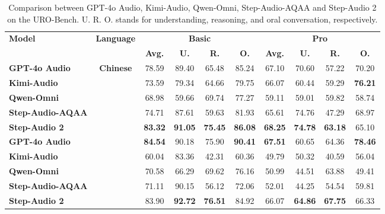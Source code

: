 \begin{table}[ht]
\centering
\caption{Comparison between GPT-4o Audio, Kimi-Audio, Qwen-Omni, Step-Audio-AQAA and Step-Audio 2 on the URO-Bench. U. R. O. stands for understanding, reasoning, and oral conversation, respectively.}
\begin{tabular}{lccccccccc}
\toprule
\multirow{2}{*}{\textbf{Model}} & \multirow{2}{*}{\textbf{Language}} & \multicolumn{4}{c}{\textbf{Basic}}& \multicolumn{4}{c}{\textbf{Pro}}\\
\cmidrule(lr){3-6} \cmidrule(lr){7-10}
&&\textbf{Avg.} & \textbf{U.} & \textbf{R.} & \textbf{O.} & \textbf{Avg.} & \textbf{U.} & \textbf{R.} & \textbf{O.} \\
\midrule
\textbf{GPT-4o Audio}&  \multirow{6}{*}{\textbf{Chinese}}&78.59&89.40 &65.48 &85.24 &67.10&70.60 &57.22 & 70.20 \\
\textbf{Kimi-Audio} &                                    &73.59&79.34 &64.66 &79.75 &66.07&60.44 &59.29 & \textbf{76.21} \\
\textbf{Qwen-Omni} &                                     &68.98&59.66 &69.74 &77.27 &59.11&59.01 &59.82 & 58.74 \\
\textbf{Step-Audio-AQAA} &                               &74.71&87.61 &59.63 &81.93 &65.61&74.76  &47.29  & 68.97 \\
\textbf{Step-Audio 2} &                                  &\textbf{83.32}&\textbf{91.05} &\textbf{75.45} & \textbf{86.08} &\textbf{68.25} & \textbf{74.78} &\textbf{63.18} & 65.10  \\
\midrule
\textbf{GPT-4o Audio}&  \multirow{5}{*}{\textbf{English}}&\textbf{84.54}&90.18 &75.90 &\textbf{90.41} &\textbf{67.51}&60.65 &64.36 &\textbf{78.46} \\
\textbf{Kimi-Audio} &                                    &60.04&83.36 &42.31 &60.36 &49.79&50.32 &40.59 &56.04 \\
\textbf{Qwen-Omni} &                                     &70.58&66.29 &69.62 &76.16 &50.99&44.51 &63.88 &49.41 \\
\textbf{Step-Audio-AQAA} &                               &71.11&90.15 &56.12 &72.06 &52.01&44.25 &54.54 &59.81 \\
\textbf{Step-Audio 2} &                                  &83.90&\textbf{92.72} &\textbf{76.51} &84.92 &66.07 &\textbf{64.86} &\textbf{67.75}&66.33 \\
\bottomrule
\end{tabular}
\label{tab:uro}
\end{table}

